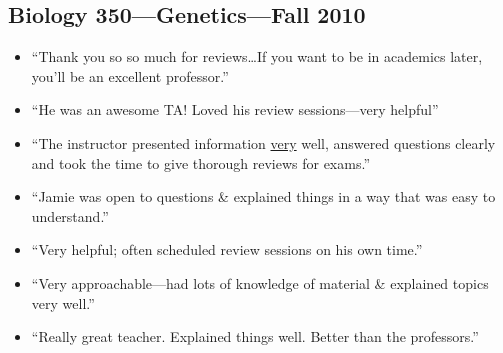 \documentclass[10pt]{article}
\newenvironment{myItemize}{
  \begin{itemize}
    \setlength{\leftskip}{-4mm}
    \setlength{\itemsep}{0.25em}
    \setlength{\parskip}{0pt}
    \setlength{\parsep}{0.5em}}
  {\end{itemize}}
\begin{document}
\subsection*{Biology 350---Genetics---Fall 2010}
\begin{myItemize}
\sffamily
\item ``Thank you so so much for reviews\ldots If you want to be in academics later, you'll be an excellent professor.''
\item ``He was an awesome TA! Loved his review sessions---very helpful''
\item ``The instructor presented information \underline{very} well, answered questions clearly and took the time to give thorough reviews for exams.''
\item ``Jamie was open to questions \& explained things in a way that was easy to understand.''
\item ``Very helpful; often scheduled review sessions on his own time.''
\item ``Very approachable---had lots of knowledge of material \& explained topics very well.''
\item ``Really great teacher. Explained things well. Better than the professors.''
\end{myItemize}
\end{document}
